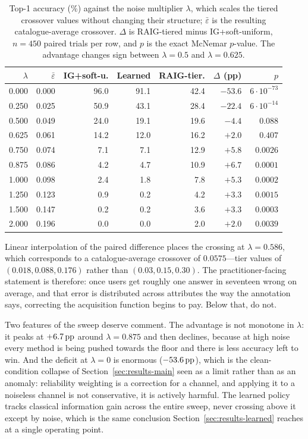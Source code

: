 \begin{table}[t]
\caption{Top-1 accuracy (\%) against the noise multiplier $\lambda$, which
scales the tiered crossover values without changing their structure;
$\bar\varepsilon$ is the resulting catalogue-average crossover. $\Delta$ is
RAIG-tiered minus IG+soft-uniform, $n = 450$ paired trials per row, and $p$ is
the exact McNemar $p$-value. The advantage changes sign between
$\lambda = 0.5$ and $\lambda = 0.625$.}
\label{tab:lambda}
\centering
\scriptsize
\begin{tabular}{@{}rrrrrrr@{}}
\toprule
$\lambda$ & $\bar\varepsilon$ & \textbf{IG+soft-u.} & \textbf{Learned} &
\textbf{RAIG-tier.} & \textbf{$\Delta$ (pp)} & \textbf{$p$} \\
\midrule
0.000 & 0.000 & 96.0 & 91.1 & 42.4 & $-53.6$ & $6{\cdot}10^{-73}$ \\
0.250 & 0.025 & 50.9 & 43.1 & 28.4 & $-22.4$ & $6{\cdot}10^{-14}$ \\
0.500 & 0.049 & 24.0 & 19.1 & 19.6 & $-4.4$  & $0.088$ \\
0.625 & 0.061 & 14.2 & 12.0 & 16.2 & $+2.0$  & $0.407$ \\
0.750 & 0.074 & 7.1  & 7.1  & 12.9 & $+5.8$  & $0.0026$ \\
0.875 & 0.086 & 4.2  & 4.7  & 10.9 & $+6.7$  & $0.0001$ \\
1.000 & 0.098 & 2.4  & 1.8  & 7.8  & $+5.3$  & $0.0002$ \\
1.250 & 0.123 & 0.9  & 0.2  & 4.2  & $+3.3$  & $0.0015$ \\
1.500 & 0.147 & 0.2  & 0.2  & 3.6  & $+3.3$  & $0.0003$ \\
2.000 & 0.196 & 0.0  & 0.0  & 2.0  & $+2.0$  & $0.0039$ \\
\bottomrule
\end{tabular}
\end{table}

Linear interpolation of the paired difference places the crossing at
$\lambda = 0.586$, which corresponds to a catalogue-average crossover of
$0.0575$---tier values of $(0.018, 0.088, 0.176)$ rather than
$(0.03, 0.15, 0.30)$. The practitioner-facing statement is therefore: once
users get roughly one answer in seventeen wrong on average, and that error is
distributed across attributes the way the annotation says, correcting the
acquisition function begins to pay. Below that, do not.

Two features of the sweep deserve comment. The advantage is not monotone in
$\lambda$: it peaks at $+6.7\,\text{pp}$ around $\lambda = 0.875$ and then declines,
because at high noise every method is being pushed towards the floor and there
is less accuracy left to win. And the deficit at $\lambda = 0$ is enormous
($-53.6\,\text{pp}$), which is the clean-condition collapse of
Section~\ref{sec:results-main} seen as a limit rather than as an anomaly:
reliability weighting is a correction for a channel, and applying it to a
noiseless channel is not conservative, it is actively harmful. The learned
policy tracks classical information gain across the entire sweep, never
crossing above it except by noise, which is the same conclusion
Section~\ref{sec:results-learned} reaches at a single operating point.

